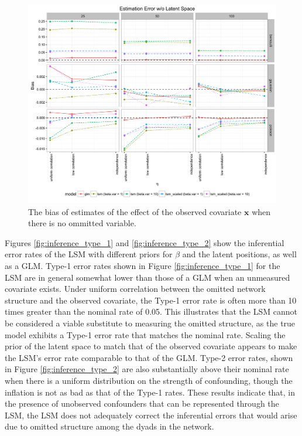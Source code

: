 \documentclass[11pt]{article}
\begin{document}
\begin{figure}
\includegraphics[width=\textwidth]{figures/estimation_nls.png}
\caption{The bias of estimates of the effect of the observed covariate $\mathbf{x}$ when there is no ommitted variable.
\label{fig:estimation_nls}}
\end{figure}

Figures \ref{fig:inference_type_1} and \ref{fig:inference_type_2} show the inferential error rates of the LSM with different priors for $\beta$ and the latent positions, as well as a GLM. Type-1 error rates shown in Figure \ref{fig:inference_type_1} for the LSM are in general somewhat lower than those of a GLM when an unmeasured covariate exists. Under uniform correlation between the omitted network structure and the observed covariate, the Type-1 error rate is often more than 10 times greater than the nominal rate of 0.05. This illustrates that the LSM cannot be considered a viable substitute to measuring the omitted structure, as the true model exhibits a Type-1 error rate that matches the nominal rate. Scaling the prior of the latent space to match that of the observed covariate appears to make the LSM's error rate comparable to that of the GLM. Type-2 error rates, shown in Figure \ref{fig:inference_type_2} are also substantially above their nominal rate when there is a uniform distribution on the strength of confounding, though the inflation is not as bad as that of the Type-1 rates. These results indicate that, in the presence of unobserved confounders that can be represented through the LSM, the LSM does not adequately correct the inferential errors that would arise due to omitted structure among the dyads in the network.
\end{document}
